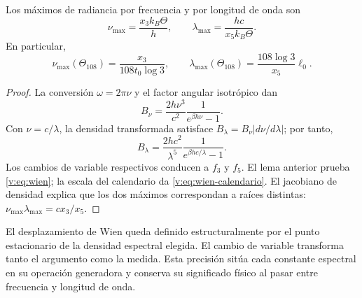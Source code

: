 \begin{proposition}
\label{v:prop:wien}
Los máximos de radiancia por frecuencia y por longitud de onda son
\begin{equation}
 \nu_{\max}=\frac{x_3 k_B\Theta}{h},\qquad
 \lambda_{\max}=\frac{hc}{x_5 k_B\Theta}.
 \label{v:eq:wien}
\end{equation}
En particular,
\begin{equation}
 \nu_{\max}(\Theta_{108})=
 \frac{x_3}{108t_0\log3},\qquad
 \lambda_{\max}(\Theta_{108})=
 \frac{108\log3}{x_5}\ell_0.
 \label{v:eq:wien-calendario}
\end{equation}
\end{proposition}
\begin{proof}
La conversión \(\omega=2\pi\nu\) y el factor angular isotrópico dan
\[
 B_\nu=\frac{2h\nu^3}{c^2}\frac1{e^{\beta h\nu}-1}.
\]
Con \(\nu=c/\lambda\), la densidad transformada satisface
\(B_\lambda=B_\nu|d\nu/d\lambda|\); por tanto,
\[
 B_\lambda=\frac{2hc^2}{\lambda^5}
 \frac1{e^{\beta hc/\lambda}-1}.
\]
Los cambios de variable respectivos conducen a \(f_3\) y \(f_5\).
El lema anterior prueba \eqref{v:eq:wien}; la escala del calendario
da \eqref{v:eq:wien-calendario}. El jacobiano de densidad explica que
los dos máximos correspondan a raíces distintas:
\(\nu_{\max}\lambda_{\max}=c x_3/x_5\).
\end{proof}

El desplazamiento de Wien queda definido estructuralmente por el punto
estacionario de la densidad espectral elegida. El cambio de variable
transforma tanto el argumento como la medida. Esta precisión sitúa
cada constante espectral en su operación generadora y conserva su
significado físico al pasar entre frecuencia y longitud de onda.
